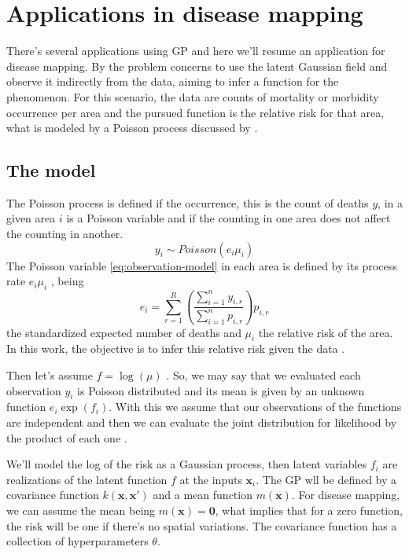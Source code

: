 \section{Applications in disease mapping}
There's several applications using GP and here we'll resume an application for disease mapping. By \cite{Vanhatalo2010Vehtari} the problem concerns to use the latent Gaussian field and observe it indirectly from the data, aiming to infer a function for the phenomenon. For this scenario, the data are counts of mortality or morbidity occurrence per area and the pursued function is the relative risk for that area, what is modeled by a Poisson process discussed by \cite{Best2005}.

\subsection{The model}

The Poisson process is defined if the occurrence, this is the count of deaths $y$, in a given area $i$ is a Poisson variable and if the counting in one area does not affect the counting in another. 
%
\begin{equation}
    y_i \sim Poisson(e_i\mu_i)
    \label{eq:observation-model}
\end{equation}
%
The Poisson variable \eqref{eq:observation-model} in each area is defined by its process rate $e_i\mu_i$ \cite{Best2005,Samat2012}, being 
%
\begin{equation}
    e_{i}=\sum_{r=1}^{R}\left(\frac{\sum_{i=1}^{n} y_{i, r}}{\sum_{i=1}^{n} p_{i, r}}\right) p_{i, r}
    \label{eq:standized-num-death}
\end{equation}
%
the standardized expected number of deaths and $\mu_i$ the relative risk of the area. In this work, the objective is to infer this relative risk given the data \cite{lawson2013statistical}. 

Then let's assume $f=\log (\mu)$ \cite{Best2005}. So, we may say that we evaluated each observation $y_i$ is Poisson distributed and its mean is given by an unknown function $e_i \exp(f_i)$. With this we assume that our observations of the functions are independent and then we can evaluate the joint distribution for likelihood by the product of each one \cite{jarno2010}.

We'll model the log of the risk as a Gaussian process, then latent variables $f_i$ are realizations of the latent function $f$ at the inputs $\mathbf{x}_i$. The GP wll be defined by a covariance function $k(\mathbf{x},\mathbf{x}')$ and a mean function $m(\mathbf{x})$. For disease mapping, we can assume the mean being $m(\mathbf{x})=\mathbf{0}$, what implies that for a zero function, the risk will be one if there's no spatial variations. The covariance function has a collection of hyperparameters $\theta$.

